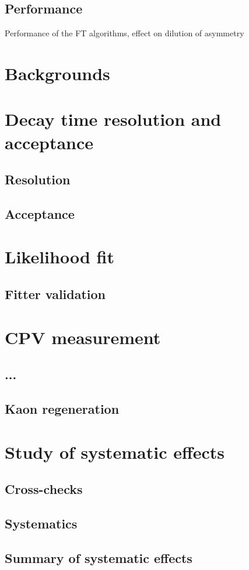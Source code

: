 \subsection{Performance}
Performance of the FT algorithms, effect on dilution of asymmetry

\section{Backgrounds}
\section{Decay time resolution and acceptance}
\subsection{Resolution}
\subsection{Acceptance}
\section{Likelihood fit}
\subsection{Fitter validation}
\section{CPV measurement}
\subsection{...}
\subsection{Kaon regeneration}
\section{Study of systematic effects}
\subsection{Cross-checks}
\subsection{Systematics}
\subsection{Summary of systematic effects}

